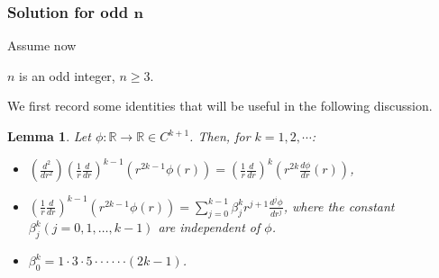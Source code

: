 \documentclass[10pt]{article}
\def\rr{{\mathbb R}}
\newtheorem{lemma}{Lemma}[section]
\begin{document}
\subsubsection{Solution for odd $\mathbf{n}$}
Assume now
\begin{center}
    $n$ is an odd integer, $n \geq 3$.
\end{center}
We first record some identities that will be useful in the following discussion. 
\begin{lemma}
    Let $\phi :\rr \to \rr \in C^{k+1}$. Then, for $k=1,2,\cdots$:
    \begin{itemize}
        \item [(i)] $\left(\frac{d^2}{dr^2}\right)\left(\frac{1}{r}\frac{d}{dr}\right)^{k-1}(r^{2k-1}\phi(r)) = \left(\frac{1}{r}\frac{d}{dr}\right)^k\left(r^{2k}\frac{d\phi}{dr}(r)\right)$,
        \item [(ii)] $\left(\frac{1}{r}\frac{d}{dr}\right)^{k-1}(r^{2k-1}\phi(r)) = \sum_{j=0}^{k-1} \beta_j^{k}r^{j+1}\frac{d^j\phi}{dr^j}$, where the constant $\beta_j^{k}(j=0, 1, \ldots, k-1)$ are independent of $\phi$.
        \item [(iii)] $\beta_0^k = 1\cdot 3\cdot 5 \cdot \cdot \cdot \cdot \cdot \cdot (2k-1)$.
    \end{itemize}
\end{lemma}
\end{document}
